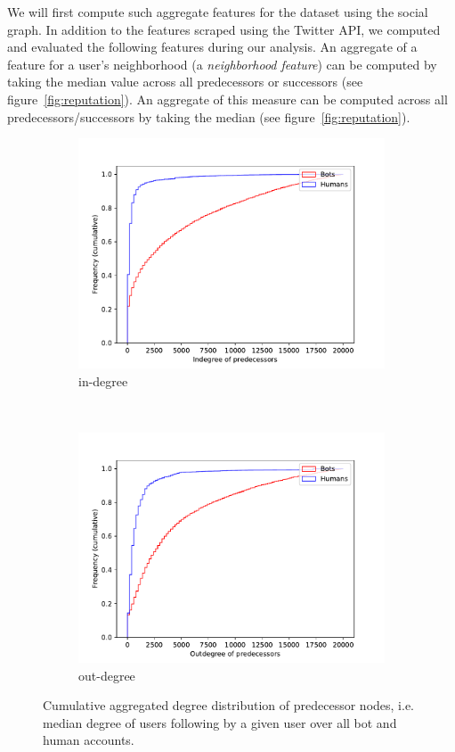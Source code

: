 We will first compute such aggregate features for the dataset using the social graph. In addition to the features scraped using the Twitter API, we computed and evaluated the following features during our analysis. An aggregate of a  feature for a user's neighborhood (a \emph{neighborhood feature}) can be computed by taking the median value across all predecessors or successors (see figure~\ref{fig:reputation}). An aggregate of this measure can be computed across all predecessors/successors by taking the median (see figure~\ref{fig:reputation}).

\begin{figure}[t!]
    \centering
    \begin{subfigure}[t]{0.5\textwidth}
        \centering
        \includegraphics[width=\textwidth]{FIG/indegree_pre.pdf}
        \caption{in-degree}
    \end{subfigure}%
    ~ 
    \begin{subfigure}[t]{0.5\textwidth}
        \centering
        \includegraphics[width=\textwidth]{FIG/outdegree_pre.pdf}
        \caption{out-degree}
    \end{subfigure}
    \caption{Cumulative aggregated degree distribution of predecessor nodes, i.e. median degree of users following by a given user over all bot and human accounts.}
    \label{fig:cum_degrees_predecessors}
\end{figure}

